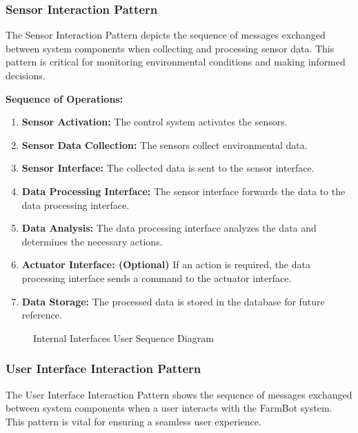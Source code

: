 \subsubsection{Sensor Interaction Pattern}

The Sensor Interaction Pattern depicts the sequence of messages exchanged between system components when collecting and processing sensor data. This pattern is critical for monitoring environmental conditions and making informed decisions.

\textbf{Sequence of Operations:}
\begin{enumerate}
    \item \textbf{Sensor Activation:} The control system activates the sensors.
    \item \textbf{Sensor Data Collection:} The sensors collect environmental data.
    \item \textbf{Sensor Interface:} The collected data is sent to the sensor interface.
    \item \textbf{Data Processing Interface:} The sensor interface forwards the data to the data processing interface.
    \item \textbf{Data Analysis:} The data processing interface analyzes the data and determines the necessary actions.
    \item \textbf{Actuator Interface: (Optional)} If an action is required, the data processing interface sends a command to the actuator interface.
    \item \textbf{Data Storage:} The processed data is stored in the database for future reference.
\end{enumerate}

\begin{figure}[H]
    \centering
    
    \caption{Internal Interfaces User Sequence Diagram}
\end{figure}


\subsubsection{User Interface Interaction Pattern}

The User Interface Interaction Pattern shows the sequence of messages exchanged between system components when a user interacts with the FarmBot system. This pattern is vital for ensuring a seamless user experience.

